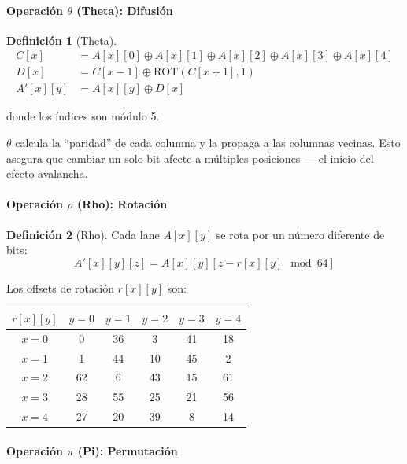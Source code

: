 \documentclass[11pt,a4paper,twoside,openright]{book}
\theoremstyle{definition}
\newtheorem{definition}{Definición}[chapter]
\theoremstyle{plain}
\theoremstyle{remark}
\begin{document}
\paragraph{Operación $\theta$ (Theta): Difusión}

\begin{definition}[Theta]
\begin{align}
C[x] &= A[x][0] \oplus A[x][1] \oplus A[x][2] \oplus A[x][3] \oplus A[x][4] \\
D[x] &= C[x-1] \oplus \text{ROT}(C[x+1], 1) \\
A'[x][y] &= A[x][y] \oplus D[x]
\end{align}

donde los índices son módulo 5.
\end{definition}

\begin{intuicion}
$\theta$ calcula la ``paridad'' de cada columna y la propaga a las columnas vecinas. Esto asegura que cambiar un solo bit afecte a múltiples posiciones --- el inicio del efecto avalancha.
\end{intuicion}

\paragraph{Operación $\rho$ (Rho): Rotación}

\begin{definition}[Rho]
Cada lane $A[x][y]$ se rota por un número diferente de bits:
\[ A'[x][y][z] = A[x][y][z - r[x][y] \mod 64] \]

Los offsets de rotación $r[x][y]$ son:
\begin{center}
\begin{tabular}{c|ccccc}
$r[x][y]$ & $y=0$ & $y=1$ & $y=2$ & $y=3$ & $y=4$ \\
\hline
$x=0$ & 0 & 36 & 3 & 41 & 18 \\
$x=1$ & 1 & 44 & 10 & 45 & 2 \\
$x=2$ & 62 & 6 & 43 & 15 & 61 \\
$x=3$ & 28 & 55 & 25 & 21 & 56 \\
$x=4$ & 27 & 20 & 39 & 8 & 14 \\
\end{tabular}
\end{center}
\end{definition}

\paragraph{Operación $\pi$ (Pi): Permutación}
\end{document}
